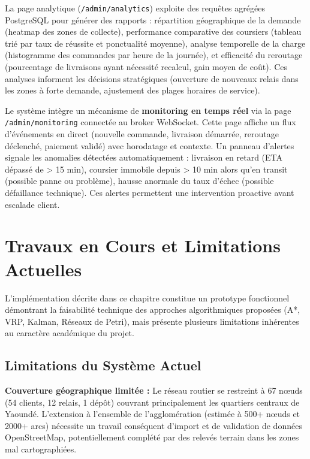 La page analytique (\texttt{/admin/analytics}) exploite des requêtes agrégées PostgreSQL pour générer des rapports : répartition géographique de la demande (heatmap des zones de collecte), performance comparative des coursiers (tableau trié par taux de réussite et ponctualité moyenne), analyse temporelle de la charge (histogramme des commandes par heure de la journée), et efficacité du reroutage (pourcentage de livraisons ayant nécessité recalcul, gain moyen de coût). Ces analyses informent les décisions stratégiques (ouverture de nouveaux relais dans les zones à forte demande, ajustement des plages horaires de service).

Le système intègre un mécanisme de \textbf{monitoring en temps réel} via la page \texttt{/admin/monitoring} connectée au broker WebSocket. Cette page affiche un flux d'événements en direct (nouvelle commande, livraison démarrée, reroutage déclenché, paiement validé) avec horodatage et contexte. Un panneau d'alertes signale les anomalies détectées automatiquement : livraison en retard (ETA dépassé de > 15 min), coursier immobile depuis > 10 min alors qu'en transit (possible panne ou problème), hausse anormale du taux d'échec (possible défaillance technique). Ces alertes permettent une intervention proactive avant escalade client.

\section{Travaux en Cours et Limitations Actuelles}

L'implémentation décrite dans ce chapitre constitue un prototype fonctionnel démontrant la faisabilité technique des approches algorithmiques proposées (A*, VRP, Kalman, Réseaux de Petri), mais présente plusieurs limitations inhérentes au caractère académique du projet.

\subsection{Limitations du Système Actuel}

\textbf{Couverture géographique limitée :} Le réseau routier se restreint à 67 nœuds (54 clients, 12 relais, 1 dépôt) couvrant principalement les quartiers centraux de Yaoundé. L'extension à l'ensemble de l'agglomération (estimée à 500+ nœuds et 2000+ arcs) nécessite un travail conséquent d'import et de validation de données OpenStreetMap, potentiellement complété par des relevés terrain dans les zones mal cartographiées.

